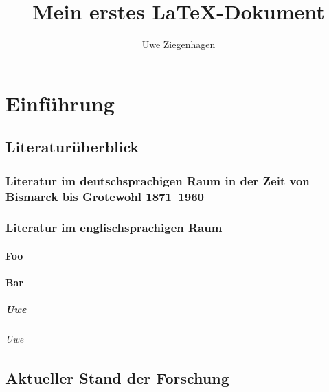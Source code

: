 \documentclass[ngerman,12pt]{scrreprt}
\author{Uwe Ziegenhagen}
\title{Mein erstes \LaTeX-Dokument}
\begin{document}
 
\maketitle

\tableofcontents

\chapter{Einführung}

\section{Literaturüberblick}

\blindtext[5]

\subsection[Literatur im deutschsprachigen Raum]{Literatur im deutschsprachigen Raum in der Zeit von Bismarck bis Grotewohl 1871--1960}

\blindtext[5]

\subsection{Literatur im englischsprachigen Raum}

\blindtext[5]

\subsubsection{Foo}

\blindtext[5]

\subsubsection{Bar}

\blindtext[5]

\paragraph{Uwe} \blindtext

\subparagraph{Uwe} \blindtext

\section{Aktueller Stand der Forschung}

\blindtext[5]
\end{document}
